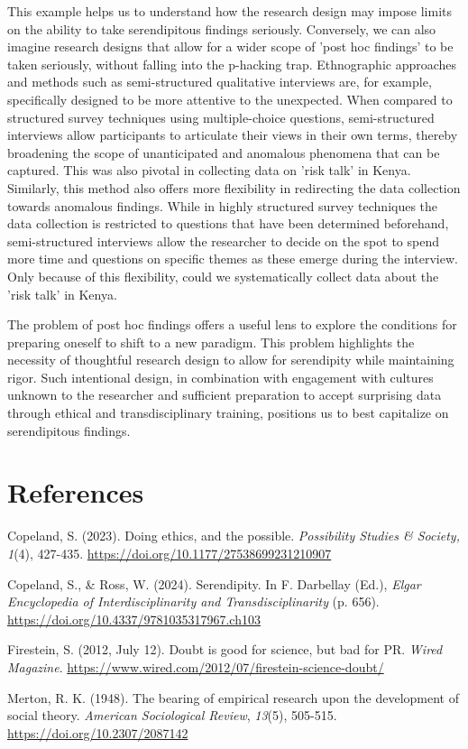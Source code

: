 \documentclass[authordate, empirical]{jote-new-article}
\begin{document}
	This example helps us to understand how the research design may impose limits on the ability to take serendipitous findings seriously. Conversely, we can also imagine research designs that allow for a wider scope of 'post hoc findings' to be taken seriously, without falling into the p-hacking trap. Ethnographic approaches and methods such as semi-structured qualitative interviews are, for example, specifically designed to be more attentive to the unexpected. When compared to structured survey techniques using multiple-choice questions, semi-structured interviews allow participants to articulate their views in their own terms, thereby broadening the scope of unanticipated and anomalous phenomena that can be captured. This was also pivotal in collecting data on 'risk talk' in Kenya. Similarly, this method also offers more flexibility in redirecting the data collection towards anomalous findings. While in highly structured survey techniques the data collection is restricted to questions that have been determined beforehand, semi-structured interviews allow the researcher to decide on the spot to spend more time and questions on specific themes as these emerge during the interview. Only because of this flexibility, could we systematically collect data about the 'risk talk' in Kenya.


	The problem of post hoc findings offers a useful lens to explore the conditions for preparing oneself to shift to a new paradigm. This problem highlights the necessity of thoughtful research design to allow for serendipity while maintaining rigor. Such intentional design, in combination with engagement with cultures unknown to the researcher and sufficient preparation to accept surprising data through ethical and transdisciplinary training, positions us to best capitalize on serendipitous findings.







	\section{References}




	Copeland, S. (2023). Doing ethics, and the possible. \emph{Possibility Studies \& Society,} \emph{1}(4), 427-435. \url{https://doi.org/10.1177/27538699231210907}


	Copeland, S., \& Ross, W. (2024). Serendipity. In F. Darbellay (Ed.), \emph{Elgar Encyclopedia of Interdisciplinarity and Transdisciplinarity }(p. 656). \url{https://doi.org/10.4337/9781035317967.ch103}

	Firestein, S. (2012, July 12). Doubt is good for science, but bad for PR. \emph{Wired Magazine}. \url{https://www.wired.com/2012/07/firestein-science-doubt/}

	Merton, R. K. (1948). The bearing of empirical research upon the development of social theory. \emph{American Sociological Review}, \emph{13}(5), 505-515. \url{https://doi.org/10.2307/2087142}
\end{document}

